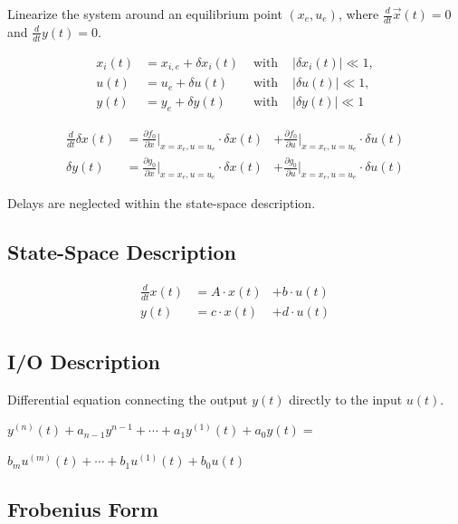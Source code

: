\documentclass[10pt,a4paper]{scrartcl}
\begin{document}
\begin{multicols*}{3}
	Linearize the system around an equilibrium point $(x_e,u_e)$, where $\frac{d}{dt}\vec{x}(t)=0$ and $\frac{d}{dt}y(t)=0$.
	
	\begin{alignat*}{4}
	x_i(t)&=x_{i,e}+\delta x_i(t)&\text{ with  }&|\delta x_i(t)|\ll 1,\\
	u(t)&=u_e+\delta u(t)&\text{ with  }&|\delta u(t)|\ll 1,\\
	y(t)&=y_e+\delta y(t)&\text{ with  } &|\delta y(t)|\ll 1
	\end{alignat*}
	
	\begin{alignat*}{3}
	\frac{d}{dt}\delta x(t) &= \frac{\partial f_0}{\partial x}|_{x=x_e,u=u_e}\cdot \delta x(t)&+\frac{\partial f_0}{\partial u}|_{x=x_e,u=u_e}\cdot \delta u(t)\\
	\delta y(t)&=\frac{\partial g_0}{\partial x}|_{x=x_e,u=u_e}\cdot\delta x(t) &+\frac{\partial g_0}{\partial u}|_{x=x_e,u=u_e}\cdot\delta u(t)
	\end{alignat*}
	
	Delays are neglected within the state-space description.
	
	
	\subsection{State-Space Description}
	
	
	\begin{alignat*}{3}
	\frac{d}{dt}x(t)&=A\cdot x(t) &+ b\cdot u(t)\\
	y(t)&=c\cdot x(t) &+d\cdot u(t) 
	\end{alignat*}
	
	
	
	\subsection{I/O Description}
	
	Differential equation connecting the output $y(t)$ directly to the input $u(t)$.
	
	$y^{(n)}(t)+a_{n-1}y^{n-1}+\cdots+a_1y^{(1)}(t)+a_0y(t)=$
	
	$b_mu^{(m)}(t)+\cdots+b_1u^{(1)}(t)+b_0u(t)$
	
	
	
	\subsection{Frobenius Form}
	

\end{multicols*}
\end{document}
